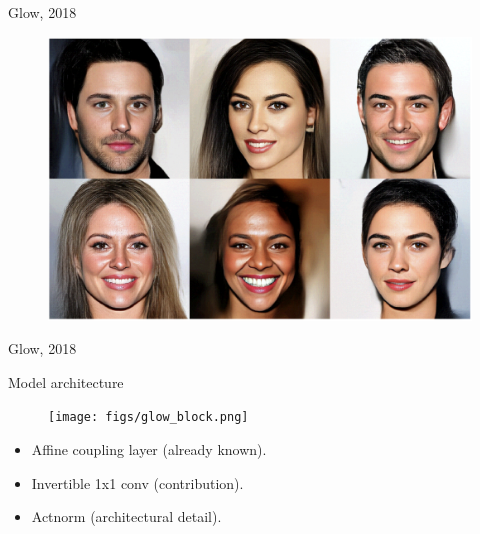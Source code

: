 \begin{frame}{Glow, 2018}
	\begin{figure}
		\centering
		\includegraphics[width=\linewidth]{figs/glow_faces.png}
	\end{figure}
\end{frame}
\begin{frame}{Glow, 2018}
	\begin{block}{Model architecture}
		\begin{figure}
			\centering
			\texttt{[image: figs/glow\_block.png]}
		\end{figure}
	\end{block}
	\vspace{-0.5cm}
	\begin{itemize}
	\item Affine coupling layer (already known).
	\item Invertible 1x1 conv (contribution).
	\item Actnorm (architectural detail).
	\end{itemize}
\end{frame}
